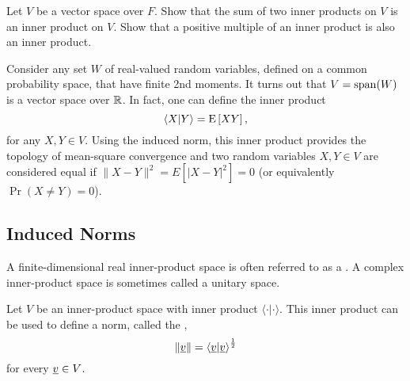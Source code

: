 \begin{problem}
Let $V$ be a vector space over $F$.
Show that the sum of two inner products on $V$ is an inner product on $V$.
Show that a positive multiple of an inner product is also an inner product.
\end{problem}

\begin{example}
Consider any set $W$ of real-valued random variables, defined on a common probability space, that have finite 2nd moments.
It turns out that $V = \mathrm{span} (W)$ is a vector space over $\mathbb{R}$.
In fact, one can define the inner product
\begin{equation*}
\left\langle X | Y \right\rangle = \mathrm{E} \left[ XY \right] ,
\end{equation*}
for any $X,Y \in V$.
Using the induced norm, this inner product provides the topology of mean-square convergence and two random variables $X,Y\in V$ are considered equal if $\| X-Y \|^2 = E \left[ |X-Y|^2 \right] = 0$ (or equivalently $\Pr (X \neq Y ) = 0$).
\end{example}


\subsection{Induced Norms}

A finite-dimensional real inner-product space is often referred to as a .
A complex inner-product space is sometimes called a unitary space.

\begin{definition}
Let $V$ be an inner-product space with inner product $\langle \cdot | \cdot \rangle$.
This inner product can be used to define a norm, called the ,
\begin{equation*}
\left\| \underline{v} \right\| = \left\langle \underline{v} | \underline{v} \right\rangle^{\frac{1}{2}}
\end{equation*}
for every $\underline{v} \in V$.
\end{definition}

